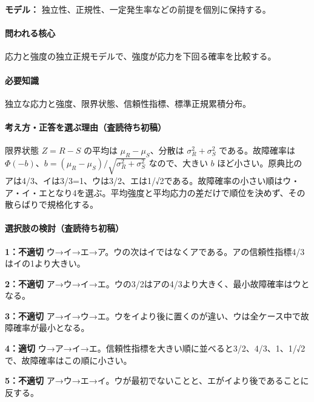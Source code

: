 \noindent\textbf{モデル：} 独立性、正規性、一定発生率などの前提を個別に保持する。\par

\paragraph{問われる核心} 応力と強度の独立正規モデルで、強度が応力を下回る確率を比較する。

\paragraph{必要知識} 独立な応力と強度、限界状態、信頼性指標、標準正規累積分布。

\paragraph{考え方・正答を選ぶ理由（査読待ち初稿）} 限界状態 \(Z=R-S\) の平均は \(\mu_R-\mu_S\)、分散は \(\sigma_R^2+\sigma_S^2\) である。故障確率は \(\Phi(-b)\)、\(b=(\mu_R-\mu_S)/\sqrt{\sigma_R^2+\sigma_S^2}\) なので、大きい \(b\) ほど小さい。原典比のアは4/3、イは3/3=\allowbreak{}1、ウは3/2、エは1/√2である。故障確率の小さい順はウ・ア・イ・エとなり4を選ぶ。平均強度と平均応力の差だけで順位を決めず、その散らばりで規格化する。

\paragraph{選択肢の検討（査読待ち初稿）}\mbox{}\par

\noindent\textbf{1：不適切} ウ→イ→エ→ア。ウの次はイではなくアである。アの信頼性指標4/3はイの1より大きい。\par

\noindent\textbf{2：不適切} ア→ウ→イ→エ。ウの3/2はアの4/3より大きく、最小故障確率はウとなる。\par

\noindent\textbf{3：不適切} ア→イ→ウ→エ。ウをイより後に置くのが違い、ウは全ケース中で故障確率が最小となる。\par

\noindent\textbf{4：適切} ウ→ア→イ→エ。信頼性指標を大きい順に並べると3/2、4/3、1、1/√2で、故障確率はこの順に小さい。\par

\noindent\textbf{5：不適切} ア→ウ→エ→イ。ウが最初でないことと、エがイより後であることに反する。\par

